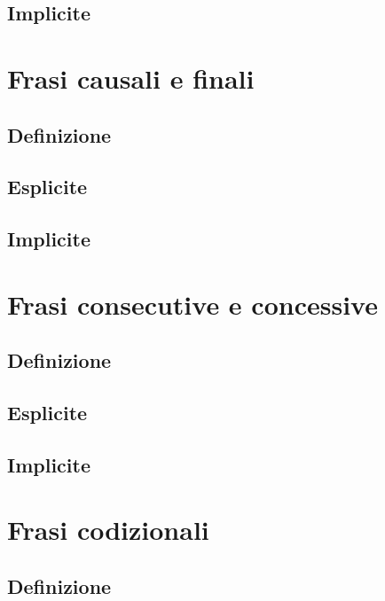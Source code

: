 \documentclass[a4paper,twoside,11pt,chapterprefix=false,bibliography=totocnumbered,listof=flat]{scrbook}
\begin{document}
\section{Implicite}\label{implicite-3}

\chapter{Frasi causali e finali}\label{frasi-causali-e-finali}

\section{Definizione}\label{definizione-2}

\section{Esplicite}\label{esplicite-4}

\section{Implicite}\label{implicite-4}

\chapter{Frasi consecutive e
concessive}\label{frasi-consecutive-e-concessive}

\section{Definizione}\label{definizione-3}

\section{Esplicite}\label{esplicite-5}

\section{Implicite}\label{implicite-5}

\chapter{Frasi codizionali}\label{frasi-codizionali}

\section{Definizione}\label{definizione-4}
\end{document}
